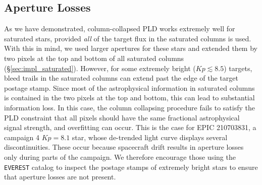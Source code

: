 \documentclass[]{aastex62}
\newcommand{\Kp}{\ensuremath{Kp}}
\begin{document}
\subsection{Aperture Losses}
\label{sec:losses}
As we have demonstrated, column-collapsed PLD works extremely well for saturated stars,
provided \emph{all} of the target flux in the saturated columns is used. With this
in mind, we used larger apertures for these stars and
extended them by two pixels at the top and bottom of all saturated columns
(\S\ref{sec:impl_saturated}). However, for some extremely bright ($\Kp \lesssim 8.5$)
targets, bleed trails in the saturated columns can extend past the edge of the
target postage stamp. Since most of the astrophysical information in saturated columns
is contained in the two pixels at the top and bottom, this can lead to substantial
information loss. In this case, the column collapsing procedure fails to satisfy the
PLD constraint that all pixels should have the same fractional astrophysical signal
strength, and overfitting can occur. This is the case for EPIC 210703831, a campaign 4
$\Kp = 8.1$ star, whose de-trended light curve displays several discontinuities. These
occur because spacecraft drift results in aperture losses only during parts of the
campaign. We therefore encourage those using the \texttt{EVEREST} catalog to inspect
the postage stamps of extremely bright stars to ensure that aperture losses are not
present.
%
\end{document}
